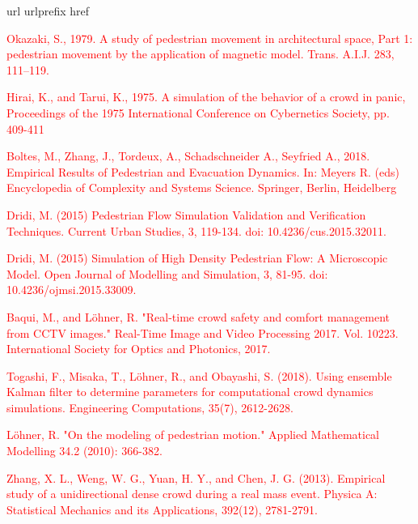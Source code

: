 \documentclass[preprint,12pt]{elsarticle}
\begin{document}
\begin{thebibliography}{10}
\expandafter\ifx\csname url\endcsname\relax
  \def\url#1{\texttt{#1}}\fi
\expandafter\ifx\csname urlprefix\endcsname\relax\def\urlprefix{URL }\fi
\expandafter\ifx\csname href\endcsname\relax
  \def\href#1#2{#2} \def\path#1{#1}\fi

\textcolor{red}{Okazaki, S., 1979. A study of pedestrian movement in 
architectural space, Part 
1: pedestrian movement by the application of magnetic model. Trans. A.I.J. 283, 
111–119.}

\textcolor{red}{Hirai, K., and Tarui, K., 1975. A simulation of the behavior of 
a crowd in panic, Proceedings of the 1975 International
Conference on Cybernetics Society, pp. 409-411}

\textcolor{red}{Boltes, M., Zhang, J., Tordeux, A., Schadschneider A., Seyfried A., 
2018. Empirical Results of Pedestrian and Evacuation Dynamics. In: Meyers R. 
(eds) Encyclopedia of Complexity and Systems Science. Springer, Berlin, 
Heidelberg}

\textcolor{red}{Dridi, M. (2015) Pedestrian Flow Simulation Validation and
Verification Techniques. Current Urban Studies, 3, 119-134.
doi: 10.4236/cus.2015.32011.}

\textcolor{red}{Dridi, M. (2015) Simulation of High Density Pedestrian Flow:
A Microscopic Model. Open Journal of Modelling and Simulation,
3, 81-95. doi: 10.4236/ojmsi.2015.33009.}

\textcolor{red}{Baqui, M., and L\"ohner, R. "Real-time crowd safety
and comfort management from CCTV images." Real-Time Image and Video Processing 2017.
Vol. 10223. International Society for Optics and Photonics, 2017.}

\textcolor{red}{Togashi, F., Misaka, T., L\"ohner, R., and Obayashi, S. (2018). 
Using ensemble Kalman filter to determine parameters for computational crowd dynamics simulations. 
Engineering Computations, 35(7), 2612-2628.}

\textcolor{red}{L\"ohner, R. "On the modeling of pedestrian motion." 
Applied Mathematical Modelling 34.2 (2010): 366-382.}

\textcolor{red}{Zhang, X. L., Weng, W. G., Yuan, H. Y., and Chen, J. G. (2013). 
Empirical study of a unidirectional dense crowd during a real mass event. 
Physica A: Statistical Mechanics and its Applications, 392(12), 2781-2791.}


\end{thebibliography}
\end{document}
